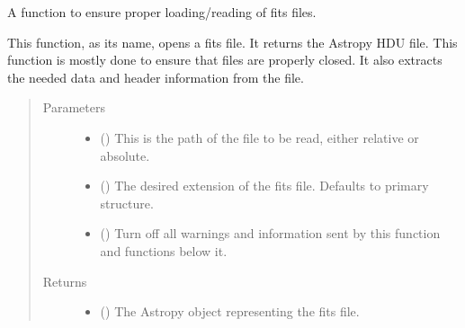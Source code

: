 \documentclass[letterpaper,10pt,english]{sphinxmanual}
\begin{document}
\begin{fulllineitems}
\label{\detokenize{python_docstrings/IfA_Smeargle.meta.fits_and_arrays:IfA_Smeargle.meta.fits_and_arrays.smeargle_open_fits_file}}
A function to ensure proper loading/reading of fits files.

This function, as its name, opens a fits file. It returns the Astropy HDU
file. This function is mostly done to ensure that files are properly
closed. It also extracts the needed data and header information from the
file.
\begin{quote}\begin{description}
\item[{Parameters}] \leavevmode\begin{itemize}
\item {} 
 () \textendash{} This is the path of the file to be read, either relative or absolute.

\item {} 
 (\sphinxstyleliteralemphasis{\sphinxupquote{ (}}\sphinxstyleliteralemphasis{\sphinxupquote{)}}) \textendash{} The desired extension of the fits file. Defaults to primary structure.

\item {} 
 (\sphinxstyleliteralemphasis{\sphinxupquote{ (}}\sphinxstyleliteralemphasis{\sphinxupquote{)}}) \textendash{} Turn off all warnings and information sent by this function and
functions below it.

\end{itemize}

\item[{Returns}] \leavevmode
\begin{itemize}
\item {} 
 () \textendash{} The Astropy object representing the fits file.


\end{itemize}
\end{description}
\end{quote}
\end{fulllineitems}
\end{document}
